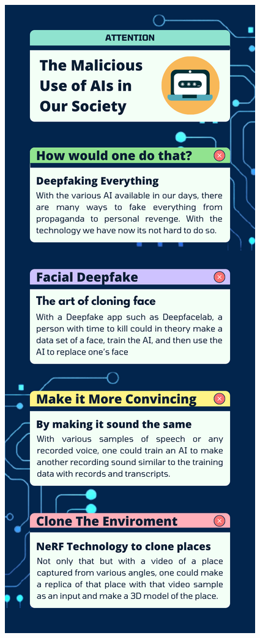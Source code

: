 \documentclass[12pt,titlepage]{article}
\begin{document}
\begin{center}
    \includegraphics[height=0.90\textheight]{images/figures/fig1.png}
\end{center}
\end{document}
